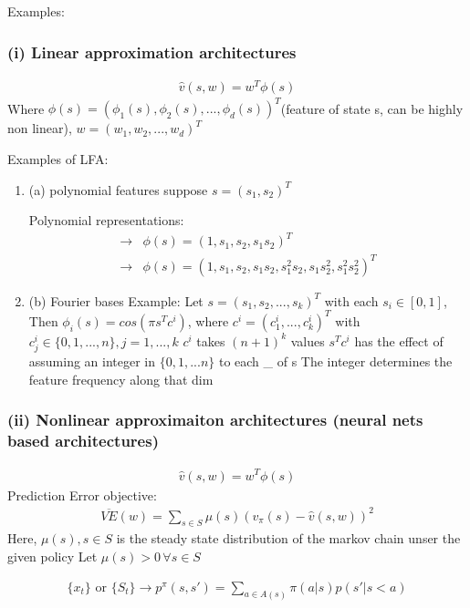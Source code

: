 \documentclass[11pt]{article}
\begin{document}
Examples:
\subsubsection{(i) Linear approximation architectures}
\label{sec:org3685ce7}
\begin{align*}
\hat{v}(s, w) = w^T \phi(s)
\end{align*}
Where \(\phi(s) = (\phi_1(s), \phi_2(s), ..., \phi_d(s))^T\)(feature of state s, can be highly non linear), \(w = (w_1, w_2, ..., w_d)^T\)

Examples of LFA:
\begin{enumerate}
\item (a) polynomial features
\label{sec:org3602b7c}
suppose \(s = (s_1, s_2)^T\)

Polynomial representations:
\begin{align*}
\rightarrow &\phi(s) = (1, s_1, s_2, s_1s_2)^T \\
\rightarrow &\phi(s) = (1, s_1, s_2, s_1s_2, s_1^2s_2, s_1s_2^2, s_1^2s_2^2)^T
\end{align*}
\item (b) Fourier bases
\label{sec:org272eb4f}
Example:
Let \(s = (s_1, s_2, ..., s_k)^T\) with each \(s_i \in [0, 1]\),
Then \(\phi_i(s) = cos(\pi s^T c^i)\), where \(c^i = (c_1^i, ..., c_k^i)^T\) with \(c_j^i \in \{0, 1, ..., n\}, j = 1, ..., k\)
\(c^i\) takes \((n+1)^k\) values
\(s^T c^i\) has the effect of assuming an integer in \(\{0, 1, ...n\}\) to each \_ of s
The integer determines the feature frequency along that dim
\end{enumerate}
\subsubsection{(ii) Nonlinear approximaiton architectures (neural nets based architectures)}
\label{sec:org1b67b2c}

\begin{align*}
\hat{v} (s, w) = w^T \phi(s)
\end{align*}
Prediction Error objective:
\begin{align*}
\overline{VE}(w) = \sum_{s \in S} \mu(s) (v_{\pi}(s) - \hat{v}(s, w))^2
\end{align*}
Here, \(\mu(s), s \in S\) is the steady state distribution of the markov chain unser the given policy
Let \(\mu(s) > 0 \,\forall s \in S\)

\begin{align*}
\{x_t\} \text{ or } \{S_t\} \rightarrow p^{\pi}(s, s') = \sum_{a \in A(s)} \pi(a | s)p(s' | s < a)
\end{align*}
\end{document}
